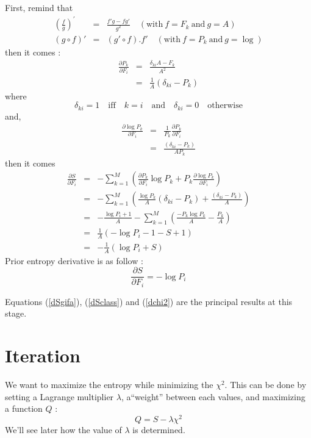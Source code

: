 \documentclass[]{article}
\newcommand{\deriv}[2]{\frac{\partial #1}{\partial #2}}
\def\c2{$\chi^2$}
\begin{document}
First, remind that
\begin{eqnarray*}
		\left ( \frac f g \right )^\prime &=& \frac{f'g -fg'}{g^2} 
	\quad (\textrm{with} \:  f = F_k \: \textrm{and} \: g = A ) \\
	(g \circ f)' &=& (g' \circ f).f' 
	\quad (\textrm{with} \:  f = P_k \: \textrm{and} \: g = \log )
\end{eqnarray*}
then it comes :
\begin{eqnarray}
	\deriv{P_k}{F_i} &=&  \frac{\delta_{ki} A - F_k}{A^2} \\
			&=&   \frac{1}{A}(\delta_{ki} - P_k)
\end{eqnarray}
where
\begin{equation}
 \delta_{ki}=1 \quad \textrm{iff} \quad k = i  \quad
 \textrm{and} \quad  \delta_{ki}=0 \quad \textrm{otherwise}
\end{equation}
and, 
\begin{eqnarray}
	\deriv{\log{P_k}}{F_i}
	&=& \frac {1}{P_k}\deriv{P_k}{F_i} \\
	&=& \frac {(\delta_{ki} - P_k)}{A P_k}
\end{eqnarray}
then it comes
\begin{eqnarray}
	\deriv{S}{F_i}
	&=& - \sum_{k=1}^M \left (
		 \deriv{P_k}{F_i}\log{P_k} + P_k \deriv{\log{P_k}}{F_i}
		\right ) \\
	&=&  - \sum_{k=1}^M \left (
	\frac{\log{P_k}}{A}(\delta_{ki} - P_k)
	+ \frac {(\delta_{ki} - P_k)}{A}
		\right ) \\   %
	&=&  
	- \frac {\log{P_i} + 1}{A}
	- \sum_{k=1}^M \left (
	 \frac{ - P_k\log{P_k}}{A}
	- \frac {P_k}{A}
		\right ) \\
	&=&  \frac {1}{A} \left (
	-\log{P_i} - 1 - S + 1
		\right ) \\
	&=& - \frac {1}{A}  ( \log{P_i} +S ) 	\label{dSgifa}
\end{eqnarray}
Prior entropy derivative is as follow :
\begin{equation}
	\deriv{S}{F_i} = - \log P_i	
\end{equation}

Equations (\ref{dSgifa}), (\ref{dSclass}) and (\ref{dchi2}) are the principal results at this stage.

\section{Iteration}
We want to maximize the entropy while minimizing the \c2.
This can be done by setting a Lagrange multiplier $\lambda$, a``weight'' between each values, 
and maximizing a function $Q$ :
\begin{equation} \label{Q_ref}
	Q = S - \lambda \chi^2
\end{equation}
We'll see later how the value of $\lambda$ is determined.
\end{document}
